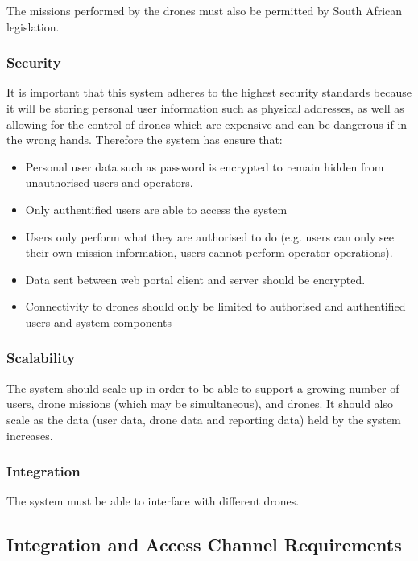 \documentclass{article}
\begin{document}
	The missions performed by the drones must also be permitted by South African legislation.
	
	\subsubsection{Security}
	It is important that this system adheres to the highest security standards because it will be storing personal user information such as physical addresses, as well as allowing for the control of drones which are expensive and can be dangerous if in the wrong hands. Therefore the system has ensure that:
	\begin{itemize}
		\item Personal user data such as password is encrypted to remain hidden from unauthorised users and operators.
		\item Only authentified users are able to access the system
		\item Users only perform what they are authorised to do (e.g. users can only see their own mission information, users cannot perform operator operations).
		\item Data sent between web portal client and server should be encrypted.
		\item Connectivity to drones should only be limited to authorised and authentified users and system components
	\end{itemize}
	
	\subsubsection{Scalability}
	The system should scale up in order to be able to support a growing number of users, drone missions (which may be simultaneous), and drones. It should also scale as the data (user data, drone data and reporting data) held by the system increases.
	
	\subsubsection{Integration}
	The system must be able to interface with different drones.
	\subsection{Integration and Access Channel Requirements}%
\end{document}

